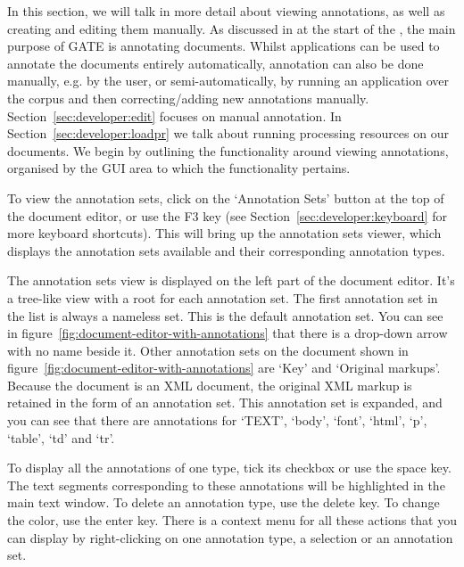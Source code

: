 
In this section, we will talk in more detail about viewing annotations, as well
as creating and editing them manually. As discussed in at the start of the
\chapthing, the main purpose of GATE is annotating documents. Whilst applications
can be used to annotate the documents entirely automatically, annotation can also
be done manually, e.g. by the user, or semi-automatically, by running an
application over the corpus and then correcting/adding new annotations manually.
Section~\ref{sec:developer:edit} focuses on manual annotation. In
Section~\ref{sec:developer:loadpr} we talk about running processing resources on
our documents. We begin by outlining the functionality around viewing
annotations, organised by the GUI area to which the functionality pertains.


To view the annotation sets, click on the `Annotation Sets' button at the top of
the document editor, or use the F3 key (see Section~\ref{sec:developer:keyboard}
for more keyboard shortcuts). This will bring up the annotation sets viewer,
which displays the annotation sets available and their corresponding annotation
types.

The annotation sets view is displayed on the left part of the document
editor. It's a tree-like view with a root for each annotation set. The first
annotation set in the list is always a nameless set. This is the default
annotation set. You can see in
figure~\ref{fig:document-editor-with-annotations} that there is a drop-down
arrow with no name beside it. Other annotation sets on the document shown in
figure~\ref{fig:document-editor-with-annotations} are `Key' and `Original
markups'. Because the document is an XML document, the original XML markup is
retained in the form of an annotation set. This annotation set is expanded, and
you can see that there are annotations for `TEXT', `body', `font', `html', `p',
`table', `td' and `tr'.

To display all the annotations of one type, tick its checkbox or use the space
key. The text segments corresponding to these annotations will be highlighted in
the main text window. To delete an annotation type, use the delete key. To change
the color, use the enter key. There is a context menu for all these actions that
you can display by right-clicking on one annotation type, a selection or an
annotation set.

